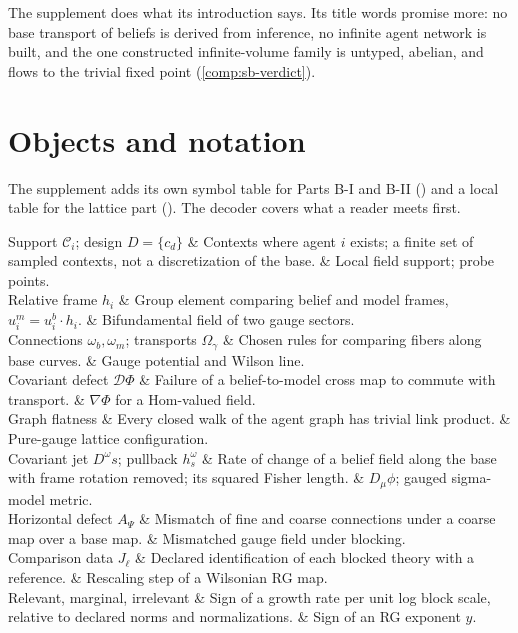 The supplement does what its introduction says. Its title words promise more: no base transport of
beliefs is derived from inference, no infinite agent network is built, and the one constructed
infinite-volume family is untyped, abelian, and flows to the trivial fixed point
(\cref{comp:sb-verdict}).

\section{Objects and notation}
\label{comp:sb-notation}

The supplement adds its own symbol table for Parts B-I and B-II () and a local
table for the lattice part (). The decoder covers what a reader meets first.

\begin{decoder}
Support \(\mathcal C_i\); design \(D=\{c_d\}\) & Contexts where agent \(i\) exists; a finite set of
sampled contexts, not a discretization of the base. & Local field support; probe points. \\
Relative frame \(h_i\) & Group element comparing belief and model frames, \(u_i^m=u_i^b\cdot h_i\). &
Bifundamental field of two gauge sectors. \\
Connections \(\omega_b,\omega_m\); transports \(\Omega_\gamma\) & Chosen rules for comparing fibers
along base curves. & Gauge potential and Wilson line. \\
Covariant defect \(\mathcal D\Phi\) & Failure of a belief-to-model cross map to commute with transport. &
\(\nabla\Phi\) for a Hom-valued field. \\
Graph flatness & Every closed walk of the agent graph has trivial link product. & Pure-gauge lattice
configuration. \\
Covariant jet \(D^\omega s\); pullback \(h^\omega_s\) & Rate of change of a belief field along the base
with frame rotation removed; its squared Fisher length. & \(D_\mu\phi\); gauged sigma-model metric. \\
Horizontal defect \(A_\Psi\) & Mismatch of fine and coarse connections under a coarse map over a base
map. & Mismatched gauge field under blocking. \\
Comparison data \(J_\ell\) & Declared identification of each blocked theory with a reference. &
Rescaling step of a Wilsonian RG map. \\
Relevant, marginal, irrelevant & Sign of a growth rate per unit log block scale, relative to declared
norms and normalizations. & Sign of an RG exponent \(y\). \\

\end{decoder}
